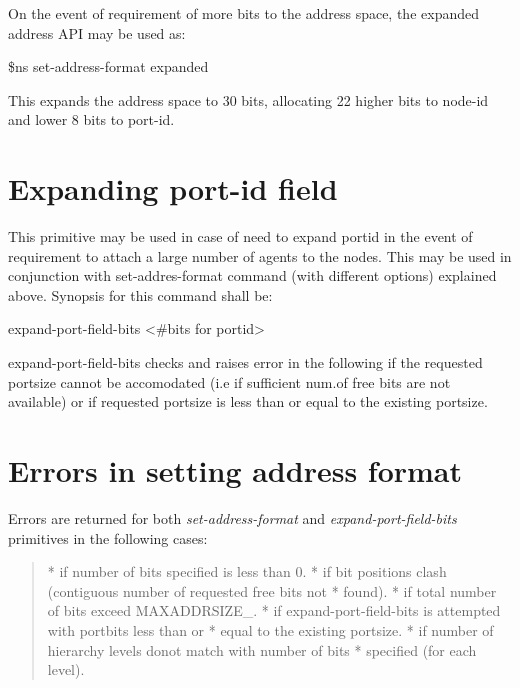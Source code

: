 On the event of requirement of more bits to the address space, the
expanded address API may be used as:

\$ns set-address-format expanded   

This expands the address space to 30 bits, allocating 22 higher bits to
node-id and lower 8 bits to port-id. 


\section{Expanding port-id field}    
\label{sec:expandportFormat}

This primitive may be used in case of need to expand portid in the event
of requirement to attach a large number of agents to the nodes. This may
be used in conjunction with set-addres-format command (with different
options) explained above. Synopsis for this command shall be:

expand-port-field-bits <\#bits for portid> 

expand-port-field-bits checks and raises error in the following if the
requested portsize cannot be accomodated (i.e if sufficient num.of free
bits are not available) or if requested portsize is less than or equal
to the existing portsize. 

\section{Errors in setting address format}
\label{sec:err-add}

Errors are returned for both {\em set-address-format} and
{\em expand-port-field-bits} primitives in the following cases:
\begin{quote}
* if number of bits specified is less than 0.
* if bit positions clash (contiguous number of requested free bits not
* found).  
* if total number of bits exceed MAXADDRSIZE\_.
* if expand-port-field-bits is attempted with portbits less than or
* equal to the existing portsize.
* if number of hierarchy levels donot match with number of bits
* specified (for each level).  
\end{quote}

\endinput





